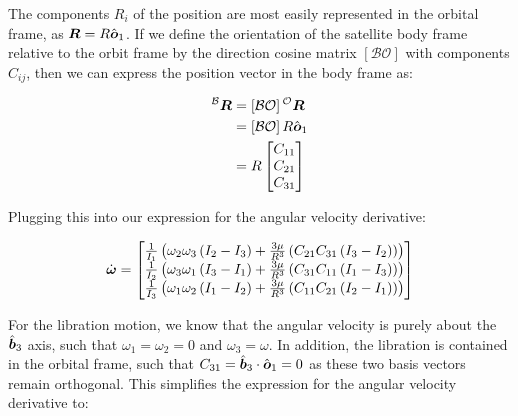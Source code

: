 The components $R_i$ of the position are most easily represented in the orbital frame, as $\boldsymbol{R} = R \hat{\boldsymbol{o}}_1$. If we define the orientation of the satellite body frame relative to the orbit frame by the direction cosine matrix $\left[\mathcal{BO}\right]$ with components $C_{ij}$, then we can express the position vector in the body frame as:

\begin{align*}
    {}^\mathcal{B}\boldsymbol{R} &= \left[\mathcal{BO}\right] {}^\mathcal{O}\boldsymbol{R} \\
    &= \left[\mathcal{BO}\right] R \hat{\boldsymbol{o}}_1 \\
    &= R \begin{bmatrix}
        C_{11} \\ C_{21} \\ C_{31}
    \end{bmatrix} \\
\end{align*}

Plugging this into our expression for the angular velocity derivative:

\begin{align*}
    \dot{\boldsymbol{\omega}} &= \begin{bmatrix}
        \frac{1}{I_1} \left(\omega_2 \omega_3 \left(I_2 - I_3\right) + \frac{3 \mu}{R^3} \left(C_{21} C_{31} \left(I_3 - I_2\right)\right)\right) \\
        \frac{1}{I_2} \left(\omega_3 \omega_1 \left(I_3 - I_1\right) + \frac{3 \mu}{R^3} \left(C_{31} C_{11} \left(I_1 - I_3\right)\right)\right) \\
        \frac{1}{I_3} \left(\omega_1 \omega_2 \left(I_1 - I_2\right) + \frac{3 \mu}{R^3} \left(C_{11} C_{21} \left(I_2 - I_1\right)\right)\right) \\
    \end{bmatrix} \\
\end{align*}

For the libration motion, we know that the angular velocity is purely about the $\hat{\boldsymbol{b}}_3$ axis, such that $\omega_1 = \omega_2 = 0$ and $\omega_3 = \omega$. In addition, the libration is contained in the orbital frame, such that $C_{31} = \hat{\boldsymbol{b}}_3 \cdot \hat{\boldsymbol{o}}_1 = 0$ as these two basis vectors remain orthogonal. This simplifies the expression for the angular velocity derivative to:

